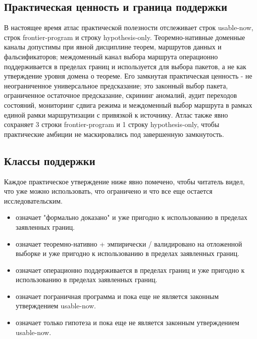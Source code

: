 \subsection{Практическая ценность и граница поддержки}
В настоящее время атлас практической полезности отслеживает  строк usable-now,  строк frontier-program и  строку hypothesis-only.
Теоремно-нативные доменные каналы допустимы при явной дисциплине теорем, маршрутов данных и фальсификаторов; междоменный канал выбора маршрута операционно поддерживается в пределах границ и используется для выбора пакетов, а не как утверждение уровня домена о теореме.
Его замкнутая практическая ценность - не неограниченное универсальное предсказание; это законный выбор пакета, ограниченное остаточное предсказание, скрининг аномалий, аудит переходов состояний, мониторинг сдвига режима и междоменный выбор маршрута в рамках единой рамки маршрутизации с привязкой к источнику.
Атлас также явно сохраняет 3 строки frontier-program и 1 строку hypothesis-only, чтобы практические амбиции не маскировались под завершенную замкнутость.

\subsection{Классы поддержки}
Каждое практическое утверждение ниже явно помечено, чтобы читатель видел, что уже можно использовать, что ограничено и что все еще остается исследовательским.
\begin{itemize}[leftmargin=1.6em,nosep]
\item {} означает "формально доказано" и уже пригодно к использованию в пределах заявленных границ.
\item {} означает теоремно-нативно + эмпирически / валидировано на отложенной выборке и уже пригодно к использованию в пределах заявленных границ.
\item {} означает операционно поддерживается в пределах границ и уже пригодно к использованию в пределах заявленных границ.
\item {} означает пограничная программа и пока еще не является законным утверждением usable-now.
\item {} означает только гипотеза и пока еще не является законным утверждением usable-now.
\end{itemize}

